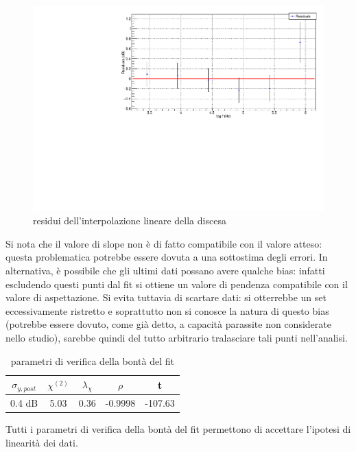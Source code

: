 \documentclass{article}
\begin{document}
\begin{center}
    \begin{figure}[H]
    \centering
    \includegraphics[scale=0.4, angle=0]{residuipreamplineare.pdf}
    \caption{residui dell'interpolazione lineare della discesa}
    \label{fig:bodepreamp_res_lineare}
    \end{figure}
\end{center}

Si nota che il valore di slope non è di fatto
compatibile con il valore atteso: questa
problematica potrebbe essere dovuta a una sottostima degli
errori. In alternativa, è possibile che gli ultimi dati possano
avere qualche bias: infatti escludendo questi punti dal fit si
ottiene un valore di pendenza compatibile con il valore di
aspettazione. Si evita tuttavia di scartare dati: si otterrebbe
un set eccessivamente ristretto e soprattutto non si conosce
la natura di questo bias (potrebbe essere dovuto, come già detto, a
capacità parassite non considerate nello studio),
 sarebbe quindi del tutto arbitrario
tralasciare tali punti nell’analisi.

\begin{table}[ht]
    \centering
    \begin{tabular}{ccccc}
        \toprule
        $\sigma_{y, post}$    &$\chi^{(2)}$    &$\lambda_{\chi}$   &$\rho$ &t      \\
        \midrule
        0.4 dB                &5.03            &0.36               &-0.9998&-107.63\\
        \bottomrule
    \end{tabular}
    \caption{parametri di verifica della bontà del fit}
\end{table}
Tutti i parametri di verifica della bontà del fit permettono di accettare
l'ipotesi di linearità dei dati.
\end{document}
